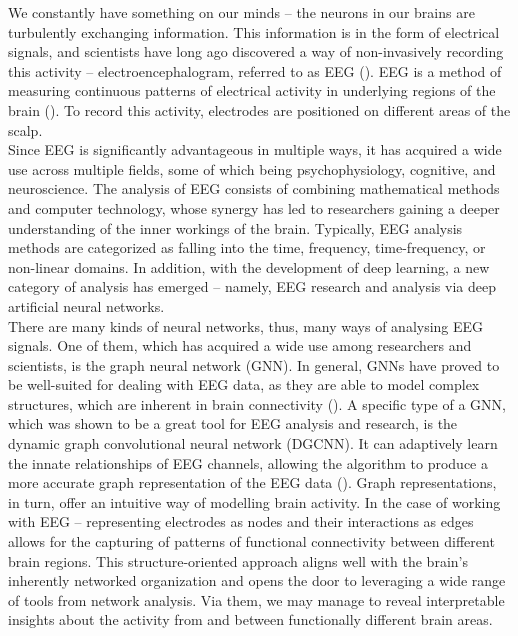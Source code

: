 We constantly have something on our minds – the neurons in our brains are turbulently exchanging information. This information is in the form of electrical signals, and scientists have long ago discovered a way of non-invasively recording this activity – electroencephalogram, referred to as EEG (\cite{ROSSINI2025132}). EEG is a method of measuring continuous patterns of electrical activity in underlying regions of the brain (\cite{eeg_measuring_method}). To record this activity, electrodes are positioned on different areas of the scalp. 
\vspace{0.5em}\\
Since EEG is significantly advantageous in multiple ways, it has acquired a wide use across multiple fields, some of which being psychophysiology, cognitive, and neuroscience. The analysis of EEG consists of combining mathematical methods and computer technology, whose synergy has led to researchers gaining a deeper understanding of the inner workings of the brain. Typically, EEG analysis methods are categorized as falling into the time, frequency, time-frequency, or non-linear domains. In addition, with the development of deep learning, a new category of analysis has emerged – namely, EEG research and analysis via deep artificial neural networks. 
\vspace{0.5em}\\
There are many kinds of neural networks, thus, many ways of analysing EEG signals. One of them, which has acquired a wide use among researchers and scientists, is the graph neural network (GNN). In general, GNNs have proved to be well-suited for dealing with EEG data, as they are able to model complex structures, which are inherent in brain connectivity (\cite{Song}). A specific type of a GNN, which was shown to be a great tool for EEG analysis and research, is the dynamic graph convolutional neural network (DGCNN). It can adaptively learn the innate relationships of EEG channels, allowing the algorithm to produce a more accurate graph representation of the EEG data (\cite{Song}). Graph representations, in turn, offer an intuitive way of modelling brain activity. In the case of working with EEG -- representing electrodes as nodes and their interactions as edges allows for the capturing of patterns of functional connectivity between different brain regions. This structure-oriented approach aligns well with the brain’s inherently networked organization and opens the door to leveraging a wide range of tools from network analysis. Via them, we may manage to reveal interpretable insights about the activity from and between functionally different brain areas. 
